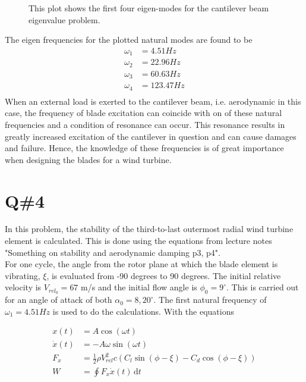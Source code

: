 \setlength\figureheight{7cm}
\setlength\figurewidth{13cm}
\begin{figure}[H]
	\hspace*{-1.8cm}
	\centering
	
	\caption{\small{This plot shows the first four eigen-modes for the cantilever beam eigenvalue problem.}}
	\label{q3_eigenmodes}
\end{figure}

The eigen frequencies for the plotted natural modes are found to be
\begin{align*}
\omega_1 &= 4.51 \unit{Hz} \\
\omega_2 &= 22.96 \unit{Hz} \\
\omega_3 &= 60.63 \unit{Hz} \\
\omega_4 &= 123.47 \unit{Hz} \\
\end{align*}
When an external load is exerted to the cantilever beam, i.e. aerodynamic in this case, the frequency of blade excitation can coincide with on of these natural frequencies and a condition of resonance can occur. This resonance results in greatly increased excitation of the cantilever in question and can cause damages and failure. Hence, the knowledge of these frequencies is of great importance when designing the blades for a wind turbine.

\section*{Q\#4}
In this problem, the stability of the third-to-last outermost radial wind turbine element is calculated. This is done using the equations from lecture notes "Something on stability and aerodynamic damping p3, p4". \\
For one cycle, the angle from the rotor plane at which the blade element is vibrating, $\xi$, is evaluated from -90 degrees to 90 degrees. The initial relative velocity is $V_{rel_0} = 67$ m/s and the initial flow angle is $\phi_0 = 9^{\circ}$. This is carried out for an angle of attack of both $\alpha_0 = 8,20 ^{\circ}$. The first natural frequency of $\omega_1 = 4.51 \unit{Hz}$ is used to do the calculations.
With the equations 

\begin{align*}
    x(t) &= A \cos(\omega t) \\
    \dot{x}(t) &= -A \omega \sin (\omega t) \\
    F_x &= \frac{1}{2} \rho V_{rel}^2 c (C_l \sin(\phi - \xi) - C_d \cos (\phi - \xi))\\
    W &= \oint F_x \dot{x}(t)\, \mathrm{d}t
\end{align*}

